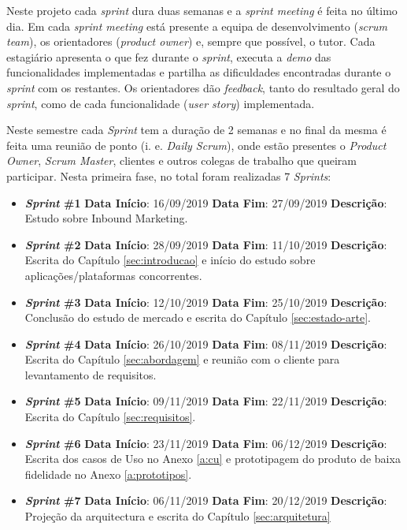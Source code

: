 Neste projeto cada \textit{sprint} dura duas semanas e a \textit{sprint meeting} é feita no último dia. Em cada\textit{ sprint meeting }está presente a equipa de desenvolvimento (\textit{scrum team}), os orientadores (\textit{product owner}) e, sempre que possível, o tutor. Cada estagiário apresenta o que fez durante o \textit{sprint}, executa a \textit{demo} das funcionalidades implementadas e partilha as dificuldades encontradas durante o \textit{sprint }com os restantes. Os orientadores dão \textit{feedback}, tanto do resultado geral do \textit{sprint}, como de cada funcionalidade (\textit{user story}) implementada.


Neste semestre cada \textit{Sprint} tem a duração de 2 semanas e no final da mesma é feita uma reunião de ponto (i. e. \textit{Daily Scrum}), onde estão presentes o \textit{Product Owner}, \textit{Scrum Master}, clientes e outros colegas de trabalho que queiram participar. Nesta primeira fase, no total foram realizadas 7 \textit{Sprints}:

\begin{itemize}
	\item \textbf{\textit{Sprint} \#1}
		\subitem \textbf{Data Início}: 16/09/2019
		\subitem \textbf{Data Fim}: 27/09/2019
		\subitem \textbf{Descrição}: Estudo sobre Inbound Marketing.
	\item \textbf{\textit{Sprint} \#2}
		\subitem \textbf{Data Início}: 28/09/2019
		\subitem \textbf{Data Fim}: 11/10/2019
		\subitem \textbf{Descrição}: Escrita do Capítulo \ref{sec:introducao} e início do estudo sobre aplicações/plataformas concorrentes.
	\item \textbf{\textit{Sprint} \#3}
		\subitem \textbf{Data Início}: 12/10/2019
		\subitem \textbf{Data Fim}: 25/10/2019
		\subitem \textbf{Descrição}: Conclusão do estudo de mercado e escrita do Capítulo \ref{sec:estado-arte}.
	\item \textbf{\textit{Sprint} \#4}
		\subitem \textbf{Data Início}: 26/10/2019
		\subitem \textbf{Data Fim}: 08/11/2019
		\subitem \textbf{Descrição}: Escrita do Capítulo \ref{sec:abordagem} e reunião com o cliente para levantamento de requisitos.
	\item \textbf{\textit{Sprint} \#5}
		\subitem \textbf{Data Início}: 09/11/2019
		\subitem \textbf{Data Fim}: 22/11/2019
		\subitem \textbf{Descrição}: Escrita do Capítulo \ref{sec:requisitos}.
	\item \textbf{\textit{Sprint} \#6}
		\subitem \textbf{Data Início}: 23/11/2019
		\subitem \textbf{Data Fim}: 06/12/2019
		\subitem \textbf{Descrição}:  Escrita dos casos de Uso no Anexo \ref{a:cu} e prototipagem do produto de baixa fidelidade no Anexo \ref{a:prototipos}.
	\item \textbf{\textit{Sprint} \#7}
		\subitem \textbf{Data Início}: 06/11/2019
		\subitem \textbf{Data Fim}: 20/12/2019
		\subitem \textbf{Descrição}: Projeção da arquitectura e escrita do Capítulo \ref{sec:arquitetura}
\end{itemize}

